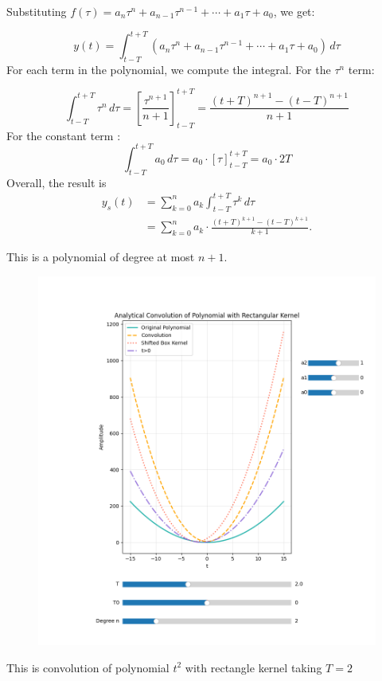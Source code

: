 \documentclass[12pt,a4paper]{report}
\begin{document}
Substituting \( f(\tau) = a_n \tau^n + a_{n-1} \tau^{n-1} + \cdots + a_1 \tau + a_0 \), we get:

\[
y(t) = \int_{t-T}^{t+T} \left( a_n \tau^n + a_{n-1} \tau^{n-1} + \cdots + a_1 \tau + a_0 \right) \, d\tau
\]
For each term in the polynomial, we compute the integral.
For the \( \tau^n \) term:

\[
\int_{t-T}^{t+T} \tau^n \, d\tau = \left[ \frac{\tau^{n+1}}{n+1} \right]_{t-T}^{t+T} = \frac{(t+T)^{n+1} - (t-T)^{n+1}}{n+1}
\]
For the constant term :
\[
\int_{t-T}^{t+T} a_0 \, d\tau = a_0 \cdot \left[ \tau \right]_{t-T}^{t+T} = a_0 \cdot 2T
\]
Overall, the result is 
\begin{align*}
y_s(t)
&= \sum_{k=0}^n a_k \int_{t - T}^{t + T} \tau^k\,d\tau \\
&= \sum_{k=0}^n a_k \cdot \frac{(t + T)^{k + 1} - (t - T)^{k + 1}}{k + 1}.
\end{align*}

This is a polynomial of degree at most $n + 1$.\\
\begin{figure}[h!]
    \centering
    \includegraphics[width=0.8\linewidth]{figs/poly_conv.png}
    \label{fig:polynomial}
\end{figure}
This is convolution of polynomial $t^2$ with rectangle kernel taking $T=2$
\pagebreak
\end{document}
